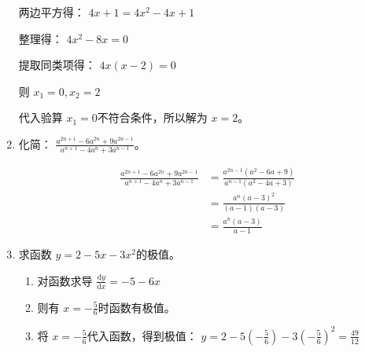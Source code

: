 \documentclass[answers]{exam}
\begin{document}
\begin{questions}
\begin{enumerate}[label=(\arabic*)]
\begin{solution}
			      两边平方得：
			      \begin{math}
				      4x + 1 = 4x^2 - 4x + 1
			      \end{math}

			      整理得：
			      \begin{math}
				      4x^2 -8x = 0
			      \end{math}

			      提取同类项得：
			      \begin{math}
				      4x(x-2) = 0
			      \end{math}

			      则
			      \begin{math}
				      x_1 = 0, x_2 = 2
			      \end{math}

			      代入验算 \( x_1 = 0  \)不符合条件，所以解为 \( x=2 \)。
		      \end{solution}
		\item 化简： \( \displaystyle \frac{a^{2n+1} - 6a^{2n} + 9a^{2n-1}}{a^{n+1} - 4a^n + 3a^{n-1}} \)。
		      \begin{solution}
			      \begin{align*}
				      \frac{a^{2n+1} - 6a^{2n} + 9a^{2n-1}}{a^{n+1} - 4a^n + 3a^{n-1}} & = \frac{a^{2n-1}(a^2 - 6a + 9)}{a^{n-1}(a^2-4a+3)}
				      \\
				                                                                       & = \frac{a^n(a-3)^2}{(a-1)(a-3)}
				      \\
				                                                                       & = \frac{a^n(a-3)}{a-1}
			      \end{align*}
		      \end{solution}
		\item 求函数 \( y = 2 - 5x - 3x^2 \)的极值。
		      \begin{solution}
			      \begin{enumerate}[label=\alph*.]
				      \item 对函数求导
				            \begin{math}
					            \frac{\text{d}y}{\text{d}x} = -5 - 6x
				            \end{math}
				      \item 则有 \( x = -\frac56 \)时函数有极值。
				      \item 将 \( x = -\frac56 \)代入函数，得到极值：
				            \begin{math}
					            y = 2 - 5(-\frac56) - 3(-\frac56)^2 = \frac{49}{12}
				            \end{math}


\end{enumerate}
\end{solution}
\end{enumerate}
\end{questions}
\end{document}
